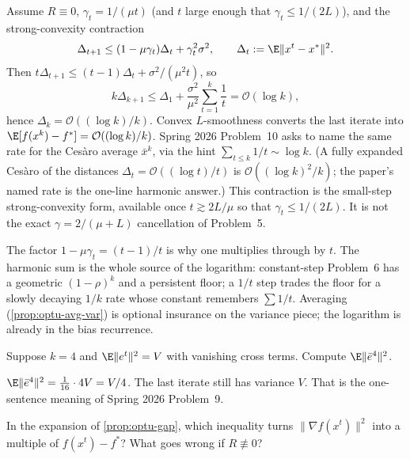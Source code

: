 \begin{proposition}
\label{prop:optu-logk}
Assume $R\equiv 0$, $\gamma_t=1/(\mu t)$ (and $t$ large enough that $\gamma_t\le 1/(2L)$), and the strong-convexity contraction
\[
\Delta_{t+1}
\le
(1-\mu\gamma_t)\Delta_t+\gamma_t^2\sigma^2,
\qquad
\Delta_t:=\E\|x^t-x^*\|^2.
\]
Then $t\Delta_{t+1}\le (t-1)\Delta_t+\sigma^2/(\mu^2 t)$, so
\[
k\Delta_{k+1}
\le
\Delta_1+\frac{\sigma^2}{\mu^2}\sum_{t=1}^k\frac1t
=
\mathcal{O}(\log k),
\]
hence $\Delta_k=\mathcal{O}((\log k)/k)$. Convex $L$-smoothness converts the last iterate into $\E[f(x^k)-f^*]=\mathcal{O}((\log k)/k)$. Spring 2026 Problem~10 asks to name the same rate for the Ces\`aro average $\bar x^k$, via the hint $\sum_{t\le k}1/t\sim\log k$. (A fully expanded Ces\`aro of the distances $\Delta_t=\mathcal{O}((\log t)/t)$ is $\mathcal{O}((\log k)^2/k)$; the paper's named rate is the one-line harmonic answer.) This contraction is the small-step strong-convexity form, available once $t\gtrsim 2L/\mu$ so that $\gamma_t\le 1/(2L)$. It is not the exact $\gamma=2/(\mu+L)$ cancellation of Problem~5.
\end{proposition}

\begin{proofsketch}
The factor $1-\mu\gamma_t=(t-1)/t$ is why one multiplies through by $t$. The harmonic sum is the whole source of the logarithm: constant-step Problem~6 has a geometric $(1-\rho)^k$ and a persistent floor; a $1/t$ step trades the floor for a slowly decaying $1/k$ rate whose constant remembers $\sum 1/t$. Averaging (\cref{prop:optu-avg-var}) is optional insurance on the variance piece; the logarithm is already in the bias recurrence.
\end{proofsketch}

\begin{exercise}
\label{ex:optu-avg-num}
Suppose $k=4$ and $\E\|e^t\|^2=V$ with vanishing cross terms. Compute $\E\|\bar e^4\|^2$.
\end{exercise}

\begin{solution}
$\E\|\bar e^4\|^2=\frac1{16}\cdot 4V=V/4$. The last iterate still has variance $V$. That is the one-sentence meaning of Spring 2026 Problem~9.
\end{solution}

\begin{exercise}
\label{ex:optu-gap}
In the expansion of \cref{prop:optu-gap}, which inequality turns $\|\nabla f(x^t)\|^2$ into a multiple of $f(x^t)-f^*$? What goes wrong if $R\not\equiv 0$?
\end{exercise}

